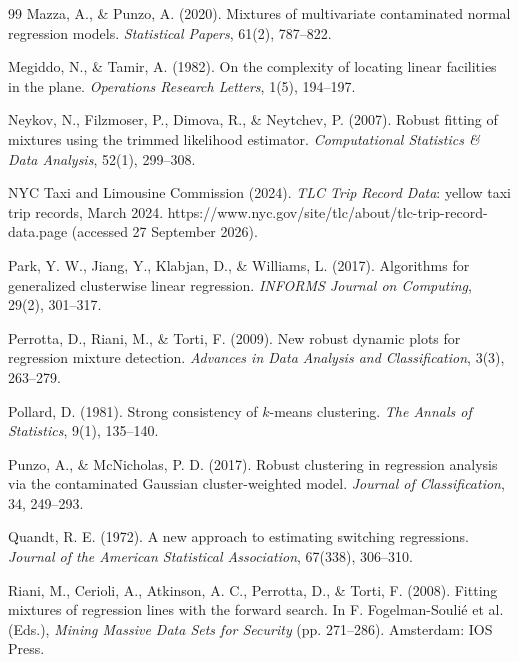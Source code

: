 \begin{thebibliography}{99}
 Mazza, A., \& Punzo, A. (2020). Mixtures of multivariate contaminated normal regression models. \textit{Statistical Papers}, 61(2), 787--822.

 Megiddo, N., \& Tamir, A. (1982). On the complexity of locating linear facilities in the plane. \textit{Operations Research Letters}, 1(5), 194--197.

 Neykov, N., Filzmoser, P., Dimova, R., \&
Neytchev, P. (2007). Robust fitting of mixtures using the trimmed likelihood estimator.
\textit{Computational Statistics \& Data Analysis}, 52(1), 299--308.

 NYC Taxi and Limousine Commission (2024). \textit{TLC Trip Record Data}: yellow taxi trip records, March 2024. https://www.nyc.gov/site/tlc/about/tlc-trip-record-data.page (accessed 27 September 2026).

 Park, Y. W., Jiang, Y., Klabjan, D., \& Williams, L. (2017). Algorithms for generalized clusterwise linear regression. \textit{INFORMS Journal on Computing}, 29(2), 301--317.

 Perrotta, D., Riani, M., \& Torti, F. (2009). New robust dynamic plots for regression mixture detection. \textit{Advances in Data Analysis and Classification}, 3(3), 263--279.

 Pollard, D. (1981). Strong consistency of
$k$-means clustering. \textit{The Annals of Statistics}, 9(1), 135--140.

 Punzo, A., \& McNicholas, P. D. (2017). Robust clustering in regression analysis via the contaminated Gaussian cluster-weighted model. \textit{Journal of Classification}, 34, 249--293.

 Quandt, R. E. (1972). A new approach to
estimating switching regressions. \textit{Journal of the American Statistical Association},
67(338), 306--310.

 Riani, M., Cerioli, A., Atkinson, A. C., Perrotta, D., \& Torti, F. (2008). Fitting mixtures of regression lines with the forward search. In F. Fogelman-Souli\'{e} et al. (Eds.), \textit{Mining Massive Data Sets for Security} (pp. 271--286). Amsterdam: IOS Press.


\end{thebibliography}
